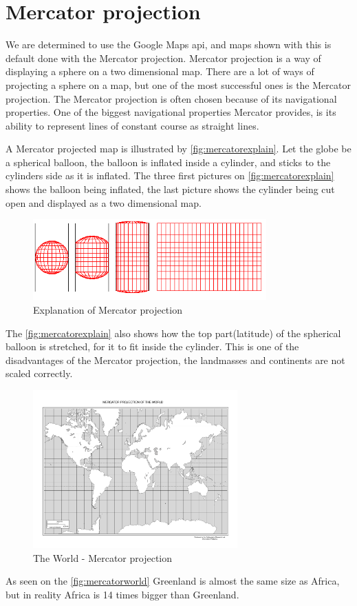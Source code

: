 \section{Mercator projection}\label{sec:mercatorprojection}
We are determined to use the Google Maps \ac{api}, and maps shown with this is default done with the Mercator projection. Mercator projection is a way of displaying a sphere on a two dimensional map. There are a lot of ways of projecting a sphere on a map, but one of the most successful ones is the Mercator projection. The Mercator projection is often chosen because of its navigational properties. One of the biggest navigational properties Mercator provides, is its ability to represent lines of constant course as straight lines.

A Mercator projected map is illustrated by \autoref{fig:mercatorexplain}. Let the globe be a spherical balloon, the balloon is inflated inside a cylinder, and sticks to the cylinders side as it is inflated. The three first pictures on \autoref{fig:mercatorexplain} shows the balloon being inflated, the last picture shows the cylinder being cut open and displayed as a two dimensional map.
\begin{figure}[H]
\centering
\includegraphics[width=0.8\textwidth]{img/mercatorexplain.png}
\caption{Explanation of Mercator projection \citep{mercatorexplain}}
\label{fig:mercatorexplain}
\end{figure}
The \autoref{fig:mercatorexplain} also shows how the top part(latitude) of the spherical balloon is stretched, for it to fit inside the cylinder. This is one of the disadvantages of the Mercator projection, the landmasses and continents are not scaled correctly.
\begin{figure}[H]
\centering
\includegraphics[width=0.7\textwidth]{img/mercatorworld.pdf}
\caption{The World - Mercator projection  \citep{mercatorworld}}
\label{fig:mercatorworld}
\end{figure} As seen on the \autoref{fig:mercatorworld} Greenland is almost the same size as Africa, but in reality Africa is 14 times bigger than Greenland.

